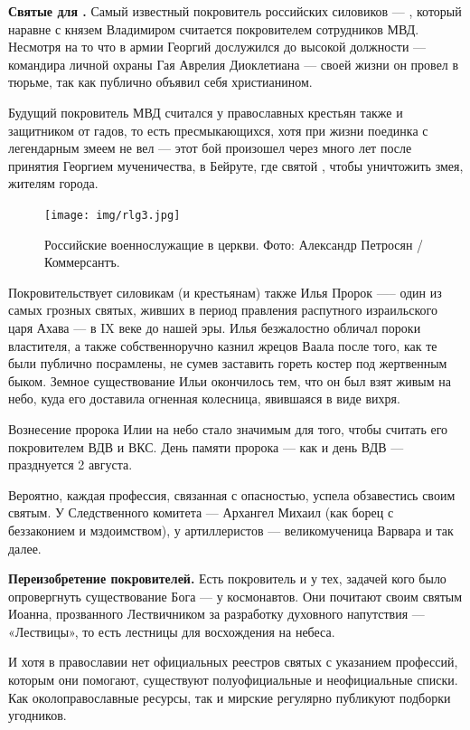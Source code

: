 \textbf{Святые для .} Самый известный покровитель российских силовиков --- , который наравне с князем Владимиром считается покровителем сотрудников МВД. Несмотря на то что в армии Георгий дослужился до высокой должности --- командира личной охраны Гая Аврелия Диоклетиана ---  своей жизни он провел в тюрьме, так как публично объявил себя христианином.

Будущий покровитель МВД считался у православных крестьян также и защитником от гадов, то есть пресмыкающихся, хотя при жизни поединка с легендарным змеем не вел --- этот бой произошел через много лет после принятия Георгием мученичества, в Бейруте, где святой , чтобы уничтожить змея,  жителям города.


\begin{figure}
    \centering
    \texttt{[image: img/rlg3.jpg]}
    \caption{Российские военнослужащие в церкви. Фото: Александр Петросян / Коммерсантъ.}
\end{figure}

Покровительствует силовикам (и крестьянам) также Илья Пророк —-- один из самых грозных святых, живших в период правления распутного израильского царя Ахава — в IX веке до нашей эры. Илья безжалостно обличал пороки властителя, а также собственноручно казнил жрецов Ваала после того, как те были публично посрамлены, не сумев заставить гореть костер под жертвенным быком. Земное существование Ильи окончилось тем, что он был взят живым на небо, куда его доставила огненная колесница, явившаяся в виде вихря.

Вознесение пророка Илии на небо стало значимым для того, чтобы считать его покровителем ВДВ и ВКС. День памяти пророка — как и день ВДВ — празднуется 2 августа.

Вероятно, каждая профессия, связанная с опасностью, успела обзавестись своим святым. У Следственного комитета — Архангел Михаил (как борец с беззаконием и мздоимством), у артиллеристов — великомученица Варвара и так далее.

\textbf{Переизобретение покровителей.} Есть покровитель и у тех, задачей кого было опровергнуть существование Бога — у космонавтов. Они почитают своим святым Иоанна, прозванного Лествичником за разработку духовного напутствия — «Лествицы», то есть лестницы для восхождения на небеса.

И хотя в православии нет официальных реестров святых с указанием профессий, которым они помогают, существуют полуофициальные и неофициальные списки. Как околоправославные ресурсы, так и мирские регулярно публикуют подборки угодников.

